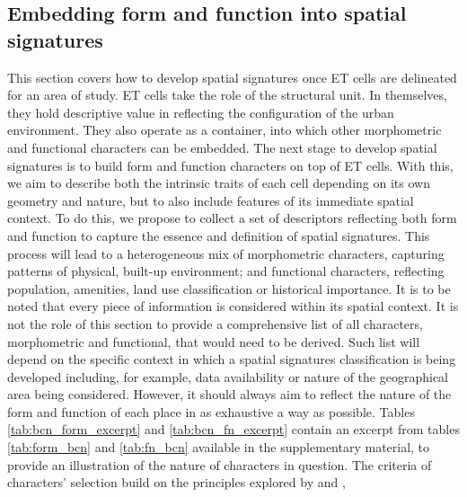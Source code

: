 \subsection{Embedding form and function into spatial signatures}
\label{ssec:ss_ff}

%
This section covers how to develop spatial signatures once ET cells are
delineated for an area of study.
ET cells take the role of the structural unit.
In themselves, they hold descriptive value in reflecting the configuration of
the urban environment. They also operate as a container, into which other
morphometric and functional characters can be embedded.
The next stage to develop spatial signatures is to build form and function
characters on top of ET cells. With this, we aim to describe both the
intrinsic traits of each cell depending on its own
geometry and nature, but to also include features of its immediate spatial
context.
To do this, we propose to collect a set of descriptors reflecting both form
and function to capture the essence and definition of spatial signatures.
%
This process will lead to a heterogeneous
mix of morphometric characters, capturing patterns of physical, built-up
environment; and functional characters, reflecting population, amenities,
land use classification or historical importance. It is to be noted that
every piece of information is considered within its spatial context.
It is not the role of this
section to provide a comprehensive list of all characters, morphometric and
functional, that would need to be derived. Such list will depend on the
specific context in which a spatial signatures classification is being
developed including, for example, data availability or nature of the
geographical area being considered.
%
However, it should always aim to reflect the nature of the form and function of each
place in as exhaustive a way as possible. Tables \ref{tab:bcn_form_excerpt} and
\ref{tab:bcn_fn_excerpt} contain an excerpt from tables \ref{tab:form_bcn} and
\ref{tab:fn_bcn} available in the supplementary material, to provide an illustration of
the nature of characters in question. The criteria of characters' selection build on the
principles explored by \cite{dibble2019origin} and \cite{fleischmann2021methodological},
